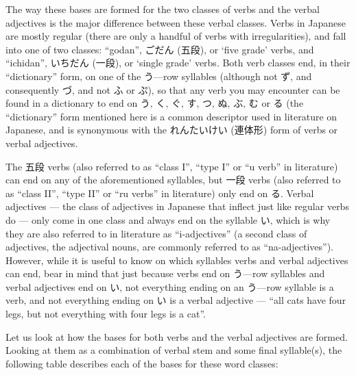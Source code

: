 \documentclass[11pt, b5paper, twoside, openright, onecolumn]{book}
\makeatletter
\newcommand*{\rubystack}[2]{{\relscale{0.5}%
  \begin{tabular}[b]{@{}c@{}}%
    {#1}\\%
   {\textscale{2}{#2}}%
  \end{tabular}}%
}
\DeclareRobustCommand*{\ruby}[2]{%
  \mbox{%
    \setlength{\parskip}{0ex}%
    \BeginAccSupp{method=pdfstringdef,ActualText={#1}}%
      \rubystack{\phantom{#2}}{#1}%
      \llap{%
        \rubystack{#2}{\phantom{#1}}%
      }%
    \EndAccSupp{}%
  }%
}
\renewcommand*{\ruby}[2]{#2 (#1)}%
\makeatother
\begin{document}
The way these bases are formed for the two classes of verbs and the verbal adjectives is the major difference between these verbal classes. Verbs in Japanese are mostly regular (there are only a handful of verbs with irregularities)‚ and fall into one of two classes: “godan”‚ \ruby{五段}{ごだん}‚ or ‘five grade’ verbs‚ and “ichidan”‚ \ruby{一段}{いちだん}‚ or ‘single grade’ verbs. Both verb classes end‚ in their “dictionary” form‚ on one of the う—row syllables (although not ず‚ and consequently づ‚ and not ふ or ぷ)‚ so that any verb you may encounter can be found in a dictionary to end on う‚ く‚ ぐ‚ す‚ つ‚ ぬ‚ ぶ‚ む or る (the “dictionary” form mentioned here is a common descriptor used in literature on Japanese‚ and is synonymous with the \ruby{連体形}{れんたいけい} form of verbs or verbal adjectives.

The 五段 verbs (also referred to as “class I”‚ “type I” or “u verb” in literature) can end on any of the aforementioned syllables‚ but 一段 verbs (also referred to as “class II”‚ “type II” or “ru verbs” in literature) only end on る. Verbal adjectives — the class of adjectives in Japanese that inflect just like regular verbs do — only come in one class and always end on the syllable い‚ which is why they are also referred to in literature as “i-adjectives” (a second class of adjectives‚ the adjectival nouns‚ are commonly referred to as “na-adjectives”). However‚ while it is useful to know on which syllables verbs and verbal adjectives can end‚ bear in mind that just because verbs end on う—row syllables and verbal adjectives end on い‚ not everything ending on an う—row syllable is a verb‚ and not everything ending on い is a verbal adjective — “all cats have four legs‚ but not everything with four legs is a cat”.

Let us look at how the bases for both verbs and the verbal adjectives are formed. Looking at them as a combination of verbal stem and some final syllable(s)‚ the following table describes each of the bases for these word classes:
\end{document}

